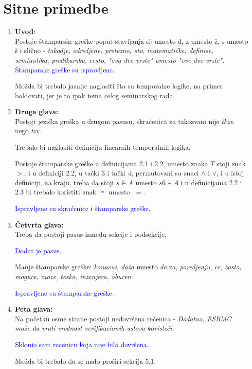 \documentclass[a4paper]{report}
\newcommand{\odgovor}[1]{\textcolor{blue}{#1}}
\newcommand{\say}[1]{\textit{#1}}
\begin{document}
\section{Sitne primedbe}
\begin{enumerate}
\item \textbf{Uvod}:\\
Postoje štamparske greške poput stavljanja dj umesto đ, z umesto ž, s umesto š i slično - \textit{takodje, odredjene, pretezno, sto, matematićke, definise, semtantika, predikarska, cesto, "ova dve vrste" umesto "ove dve vrste"}.
\odgovor{Štamparske greške su ispravljene.}

Možda bi trebalo jasnije naglasiti šta su temporalne logike, na primer boldovati, jer je to ipak tema celog seminarskog rada.

\item \textbf{Druga glava:}\\
Postoji jezička greška u drugom pasusu, skraćenica za takozvani nije \textit{tkzv.} nego  \textit{tzv.}


Trebalo bi naglasiti definiciju linearnih temporalnih logika.


Postoje štamparske greške u definicijama 2.1 i 2.2, umesto znaka $T$ stoji znak $>$, i u definiciji 2.2, u tački 3 i tački 4, permutovani su znaci  $\wedge$ i $\vee$, i u istoj definiciji, na kraju, treba da stoji $s \nvDash A$ umesto $s6 \vDash A$ i u definicijama 2.2 i 2.3 bi trebalo koristiti znak $\vDash$ umesto $\vert =$.

\odgovor{Ispravljene su skraćenice i štamparske greške.}

\item \textbf{Četvrta glava:}\\
Treba da postoji pasus između sekcije i podsekcije.

\odgovor{Dodat je pasus. }

Manje štamparske greške: \textit{konacni}, \textit{daža} umesto \say{da} za, \textit{poredjenju}, \textit{ce, zasto, moguce, moze, tesko, inzenjera, obucen}.

\odgovor{Ispravljene su štamparske greške. }

\item \textbf{Peta glava:}\\
Na početku osme strane postoji nedovršena rečenica - \say{Dodatno, ESBMC može da vrati vrednost verifikacionih uslova koristeći.}

\odgovor{Sklonio sam recenicu koja nije bila dovršena.}

Možda bi trebalo da se malo proširi sekcija 5.1.
\end{enumerate}
\end{document}
